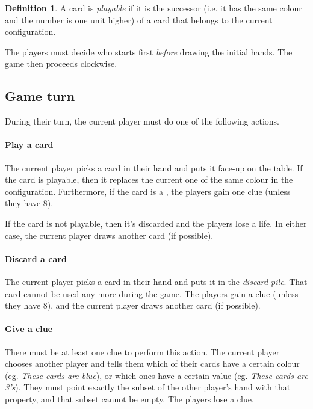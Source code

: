 \documentclass[a4paper]{article}
\theoremstyle{plain}
\theoremstyle{definition}
\newtheorem{definition}[theorem]{Definition}
\begin{document}
\begin{definition}
	A card is \textit{playable} if it is the successor (i.e. it has the same colour and the number is one unit higher) of a card that belongs to the current configuration.
\end{definition}

The players must decide who starts first \textit{before} drawing the initial hands. The game then proceeds clockwise.

\subsection{Game turn}

During their turn, the current player must do one of the following actions.

\paragraph{Play a card} The current player picks a card in their hand and puts it face-up on the table. If the card is playable, then it replaces the current one of the same colour in the configuration. Furthermore, if the card is a , the players gain one clue (unless they have 8).

If the card is not playable, then it's discarded and the players lose a life. In either case, the current player draws another card (if possible).

\paragraph{Discard a card} The current player picks a card in their hand and puts it in the \textit{discard pile}. That card cannot be used any more during the game. The players gain a clue (unless they have 8), and the current player draws another card (if possible).

\paragraph{Give a clue} There must be at least one clue to perform this action. The current player chooses another player and tells them which of their cards have a certain colour (eg. \textit{These cards are blue}), or which ones have a certain value (eg. \textit{These cards are 3's}). They must point exactly the subset of the other player's hand with that property, and that subset cannot be empty. The players lose a clue.
\end{document}
